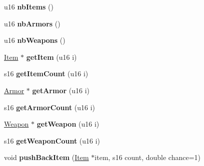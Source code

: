 \begin{DoxyCompactItemize}
\item 
\hypertarget{classInventory_ae207825e3e4ac38293dc91688ad4265e}{u16 {\bfseries nb\-Items} ()}\label{classInventory_ae207825e3e4ac38293dc91688ad4265e}

\item 
\hypertarget{classInventory_a6fbfa8249d45003e19217af040acc608}{u16 {\bfseries nb\-Armors} ()}\label{classInventory_a6fbfa8249d45003e19217af040acc608}

\item 
\hypertarget{classInventory_a073582ba34490cfdd73b6deaeff747da}{u16 {\bfseries nb\-Weapons} ()}\label{classInventory_a073582ba34490cfdd73b6deaeff747da}

\item 
\hypertarget{classInventory_ac8226bbc16088294156ee22421cabb15}{\hyperlink{classItem}{Item} $\ast$ {\bfseries get\-Item} (u16 i)}\label{classInventory_ac8226bbc16088294156ee22421cabb15}

\item 
\hypertarget{classInventory_ab2a6f3ebcb77aafa85b6fba452b7d8b5}{s16 {\bfseries get\-Item\-Count} (u16 i)}\label{classInventory_ab2a6f3ebcb77aafa85b6fba452b7d8b5}

\item 
\hypertarget{classInventory_a3f996724889d568743b0073d647a5c4b}{\hyperlink{classArmor}{Armor} $\ast$ {\bfseries get\-Armor} (u16 i)}\label{classInventory_a3f996724889d568743b0073d647a5c4b}

\item 
\hypertarget{classInventory_aee1c8092f6f9f58537d7ba10d4bd1011}{s16 {\bfseries get\-Armor\-Count} (u16 i)}\label{classInventory_aee1c8092f6f9f58537d7ba10d4bd1011}

\item 
\hypertarget{classInventory_a4559a70df613aedb16f76960cdc60b8f}{\hyperlink{classWeapon}{Weapon} $\ast$ {\bfseries get\-Weapon} (u16 i)}\label{classInventory_a4559a70df613aedb16f76960cdc60b8f}

\item 
\hypertarget{classInventory_a48a6e2a4554f39604ea12fa551e13896}{s16 {\bfseries get\-Weapon\-Count} (u16 i)}\label{classInventory_a48a6e2a4554f39604ea12fa551e13896}

\item 
\hypertarget{classInventory_a080b0370556a8492881e2ca6866a4833}{void {\bfseries push\-Back\-Item} (\hyperlink{classItem}{Item} $\ast$item, s16 count, double chance=1)}\label{classInventory_a080b0370556a8492881e2ca6866a4833}


\end{DoxyCompactItemize}
